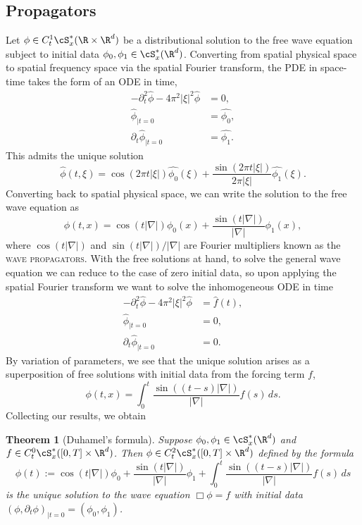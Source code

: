 \documentclass[reqno]{amsart}
\newtheorem{theorem}{Theorem}
\theoremstyle{definition}
\theoremstyle{remark}
\renewcommand{\emph}{\textsc}
\begin{document}
\subsection{Propagators}

Let $\phi \in C_t^1 \cS_{x}^* (\R \times \R^d)$ be a distributional solution to the free wave equation subject to initial data $\phi_0, \phi_1 \in \cS^*_x (\R^d)$. Converting from spatial physical space to spatial frequency space via the spatial Fourier transform, the PDE in space-time takes the form of an ODE in time, 
\begin{align*}
	- \partial_t^2 \widehat \phi - 4\pi^2 |\xi|^2 \widehat \phi 
		&= 0, \\
	\widehat \phi_{|t = 0}
		&= \widehat{\phi_0}, \\
	\partial_t \widehat{\phi}_{|t = 0}
		&= \widehat{\phi_1}.		
\end{align*}
This admits the unique solution 
	\[ \widehat \phi (t, \xi) = \cos (2\pi t |\xi|) \widehat{\phi_0} (\xi) + \frac{\sin(2\pi t|\xi|)}{2\pi |\xi|} \widehat{\phi_1} (\xi) . \]
Converting back to spatial physical space, we can write the solution to the free wave equation as
	\[ \phi(t, x) = \cos(t |\nabla|) \phi_0 (x) + \frac{\sin(t |\nabla|)}{|\nabla|} \phi_1 (x), \]
where $\cos (t |\nabla|)$ and $\sin(t |\nabla|)/|\nabla|$ are Fourier multipliers known as the \emph{wave propagators}. With the free solutions at hand, to solve the general wave equation we can reduce to the case of zero initial data, so upon applying the spatial Fourier transform we want to solve the inhomogeneous ODE in time
\begin{align*}
	- \partial_t^2 \widehat \phi - 4\pi^2 |\xi|^2 \widehat \phi 
		&= \widehat f (t), \\
	\widehat \phi_{|t = 0}
		&= 0, \\
	\partial_t \widehat{\phi}_{|t = 0}
		&= 0.		
\end{align*}
By variation of parameters, we see that the unique solution arises as a superposition of free solutions with initial data from the forcing term $f$, 
	\[ \phi(t, x) = \int_0^t \frac{\sin((t - s)|\nabla|)}{|\nabla|} f(s) \, ds. \]
Collecting our results, we obtain	

\begin{theorem}[Duhamel's formula]	
	Suppose $\phi_0, \phi_1 \in \cS_x^* (\R^d)$ and $f \in C^0_t \cS_x^* ([0, T] \times \R^d)$. Then $\phi \in C_t^2 \cS^*_x ([0, T] \times \R^d)$ defined by the formula
		\[ \phi (t) := \cos(t |\nabla|) \phi_0 + \frac{\sin(t |\nabla|)}{|\nabla|} \phi_1 + \int_0^t \frac{\sin ((t-s) |\nabla|)}{|\nabla|} f(s) \, ds \]
	is the unique solution to the wave equation $\Box \phi = f$ with initial data $(\phi, \partial_t \phi)_{|t = 0} = (\phi_0, \phi_1)$.
\end{theorem}
\end{document}
